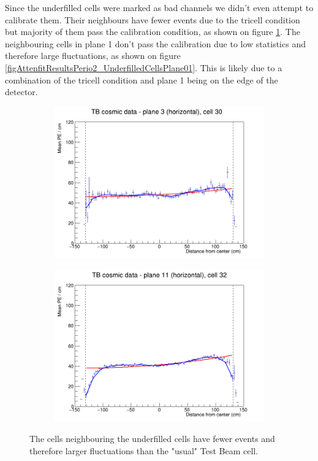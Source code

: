 \documentclass[12pt,a4paper]{article}
\begin{document}
Since the underfilled cells were marked as bad channels we didn't even attempt to calibrate them. Their neighbours have fewer events due to the tricell condition but majority of them pass the calibration condition, as shown on figure \ref{figAttenfitResultsPerio2_UnderfilledCells}. The neighbouring cells in plane 1 don't pass the calibration due to low statistics and therefore large fluctuations, as shown on figure \ref{figAttenfitResultsPerio2_UnderfilledCellsPlane01}. This is likely due to a combination of the tricell condition and plane 1 being on the edge of the detector.

\begin{figure}[h]
  \begin{subfigure}{0.5\textwidth}
    \includegraphics[width=\linewidth]{RelativeCalibrationResults/p2_003_030.png}
  \end{subfigure}
  \begin{subfigure}{0.5\textwidth}
    \includegraphics[width=\linewidth]{RelativeCalibrationResults/p2_011_032.png}
  \end{subfigure}
  \caption{The cells neighbouring the underfilled cells have fewer events and therefore larger fluctuations than the "usual" Test Beam cell.}
  \label{figAttenfitResultsPerio2_UnderfilledCells}
\end{figure}
\end{document}
